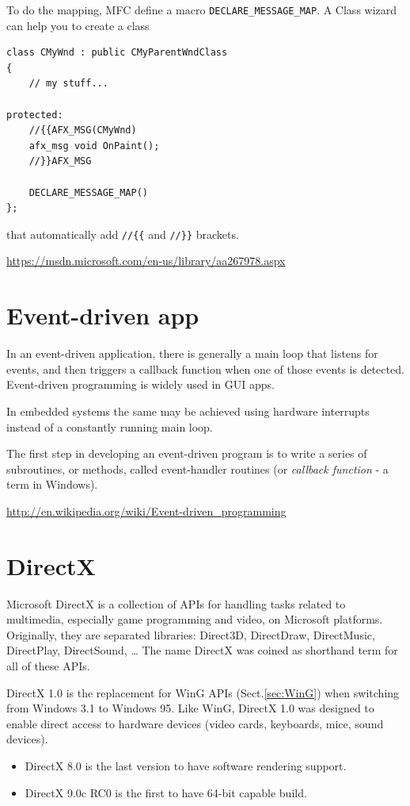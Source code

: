 To do the mapping, MFC define a macro \verb!DECLARE_MESSAGE_MAP!. A Class wizard can help you to create a class
\begin{verbatim}
class CMyWnd : public CMyParentWndClass
{
    // my stuff...

protected:
    //{{AFX_MSG(CMyWnd)
    afx_msg void OnPaint();
    //}}AFX_MSG

    DECLARE_MESSAGE_MAP()
};
\end{verbatim}
that automatically add \verb!//{{! and \verb!//}}! brackets.

\url{https://msdn.microsoft.com/en-us/library/aa267978.aspx}


\section{Event-driven app}
\label{sec:event_driven_app}

In an event-driven application, there is generally a main loop that listens for
events, and then triggers a callback function when one of those events is
detected. Event-driven programming is widely used in GUI apps.

\begin{mdframed}
In embedded systems the same may be achieved using hardware interrupts instead
of a constantly running main loop.
\end{mdframed}


The first step in developing an event-driven program is to write a series of
subroutines, or methods, called event-handler routines (or {\it callback
function} - a term in Windows).

\url{http://en.wikipedia.org/wiki/Event-driven_programming}


\section{DirectX}
\label{sec:DirectX}

Microsoft DirectX is a collection of APIs for handling
tasks related to multimedia, especially game programming and video, on
Microsoft platforms.
Originally, they are separated libraries: 
Direct3D, DirectDraw, DirectMusic, DirectPlay, DirectSound, \ldots
The name DirectX was coined as shorthand term for all of these APIs.

DirectX 1.0 is the replacement for WinG APIs (Sect.\ref{sec:WinG}) when
switching from Windows 3.1 to Windows 95. Like WinG, DirectX 1.0 was designed to
enable direct access to hardware devices (video cards, keyboards, mice, sound
devices).
\begin{itemize}
  \item DirectX 8.0 is the last version to have software rendering support.

  \item DirectX 9.0c RC0 is the first to have 64-bit capable build.
\end{itemize}

